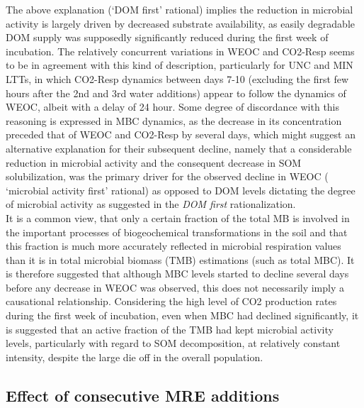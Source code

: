\documentclass[12pt]{report}
\newcommand{\myRed}[1]{\textcolor{red}{#1}} %
\begin{document}
The above explanation (‘DOM first’ rational) implies  the reduction in microbial activity is largely driven by decreased substrate availability, as easily degradable DOM supply was supposedly significantly reduced during the first week of incubation. The relatively concurrent variations in WEOC and CO2-Resp seems to be in agreement with this kind of description, particularly for UNC and MIN LTTs, in which CO2-Resp dynamics between days 7-10 (excluding the first few hours after the 2nd and 3rd water additions) appear to follow the dynamics of WEOC, albeit with a delay of 24 hour. Some  degree of discordance with this reasoning is expressed in MBC dynamics, as the decrease in its concentration preceded that of WEOC and  CO2-Resp by several days, which might suggest an alternative explanation for their subsequent decline, namely that a considerable reduction in microbial activity and the consequent decrease in SOM solubilization, was the primary driver for the observed decline in WEOC ( ‘microbial activity first’ rational) as opposed to DOM levels dictating the degree of microbial activity as suggested in the \textit{DOM first} rationalization.\\
It is a common view, that only a certain fraction of the total MB  is involved in the important processes of biogeochemical transformations in the soil \citep{blagodatskaya2013, salazar-villegas2016} and that this fraction is much more accurately reflected in microbial respiration values than it is in total microbial biomass (TMB) estimations (such as total MBC)\citep{salazar-villegas2016}. It is therefore suggested that although MBC levels started to decline several days before any decrease in WEOC was observed, this does not necessarily imply a causational relationship. Considering the high level of CO2 production rates during the first week of incubation, even when MBC had declined significantly, it is suggested that an active fraction of the TMB had kept microbial activity levels, particularly with regard to SOM decomposition, at relatively constant intensity, despite the large die off in the overall population. \\
%			

\subsection{Effect of consecutive MRE additions}
\end{document}
